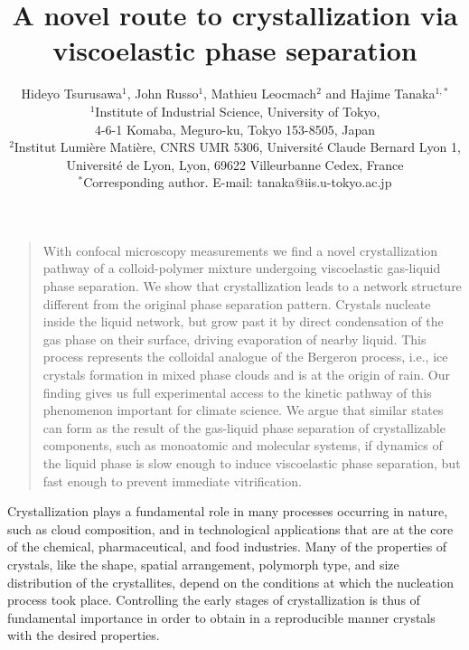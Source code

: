 \documentclass[12pt]{article}
\title{A novel route to crystallization via viscoelastic phase separation}
\author{Hideyo Tsurusawa$^1$, John Russo$^1$, Mathieu Leocmach$^{2}$ and Hajime Tanaka$^{1,\ast}$ 
\\
\normalsize{$^1$Institute of Industrial Science, University of Tokyo,}\\
\normalsize{4-6-1 Komaba, Meguro-ku, Tokyo 153-8505, Japan}\\
\normalsize{$^2$Institut Lumière Matière, CNRS UMR 5306, Université Claude Bernard Lyon 1, }\\
\normalsize{Université de Lyon, Lyon, 69622 Villeurbanne Cedex, France}\\
\normalsize{$^\ast$Corresponding author. E-mail: tanaka@iis.u-tokyo.ac.jp}}
\newenvironment{sciabstract}{%
\begin{quote} \bf}
{\end{quote}}
\begin{document}
\baselineskip24pt


\maketitle
\vspace{-1.5cm}
\begin{sciabstract}

With confocal microscopy measurements we find a novel crystallization pathway of a colloid-polymer mixture undergoing viscoelastic
gas-liquid phase separation. We show that crystallization leads to a network structure different from the original phase separation pattern.
Crystals nucleate inside the liquid network, but grow past it by direct condensation of the gas phase on their surface,
driving evaporation of nearby liquid. This process represents the colloidal analogue of the Bergeron process, i.e.,
ice crystals formation in mixed phase clouds and is at the origin of rain. Our finding gives us full experimental
access to the kinetic pathway of this phenomenon important for climate science. We argue that similar states can form as the
result of the gas-liquid phase separation of crystallizable components, such as monoatomic and molecular systems,
if dynamics of the liquid phase is slow enough to induce viscoelastic phase separation, but fast enough to prevent immediate 
vitrification.
\end{sciabstract}


\maketitle

\clearpage

Crystallization plays a fundamental role in many processes occurring in nature, such as cloud composition, and in technological applications
that are at the core of the chemical, pharmaceutical, and food industries.
Many of the properties of crystals, like the shape, spatial arrangement, polymorph type, and size distribution of the crystallites, depend on the conditions at which
the nucleation process took place. Controlling the early stages of crystallization is thus of fundamental importance in order to
obtain in a reproducible manner crystals with the desired properties. 
\end{document}

